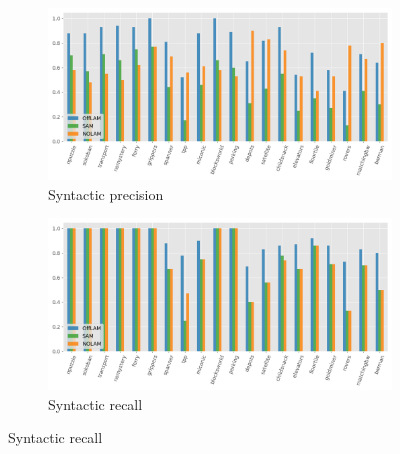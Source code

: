 
\begin{figure}[ht]
  \centering

  \begin{subfigure}[b]{0.45\textwidth}
    \includegraphics[width=\textwidth]{figures/2_traces/syn_precision.png}
    \caption{Syntactic precision}
  \end{subfigure}
  \hfill
  \begin{subfigure}[b]{0.45\textwidth}
    \includegraphics[width=\textwidth]{figures/2_traces/syn_recall.png}
    \caption{Syntactic recall}
  \end{subfigure}

  \vspace{1em}


\end{figure}
